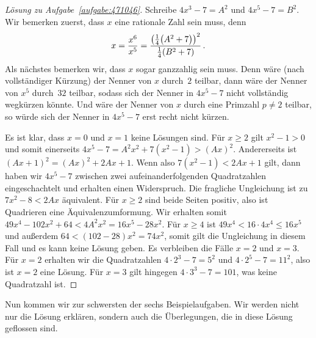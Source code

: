 \begin{proof}[Lösung zu Aufgabe~\ref{aufgabe:471046}]
	Schreibe $4x^3-7=A^2$ und $4x^5-7=B^2$. Wir bemerken zuerst, dass $x$ eine rationale Zahl sein muss, denn
	\begin{equation*}
		x=\frac{x^6}{x^5}=\frac{\parens*{\frac14\parens*{A^2+7}}^2}{\frac14\parens*{B^2+7}}\,.
	\end{equation*}
	Als nächstes bemerken wir, dass $x$ sogar ganzzahlig sein muss. Denn wäre (nach vollständiger Kürzung) der Nenner von $x$ durch~$2$ teilbar, dann wäre der Nenner von $x^5$ durch~$32$ teilbar, sodass sich der Nenner in $4x^5-7$ nicht vollständig wegkürzen könnte. Und wäre der Nenner von $x$ durch eine Primzahl $p\neq 2$ teilbar, so würde sich der Nenner in $4x^5-7$ erst recht nicht kürzen.
	
	Es ist klar, dass $x=0$ und $x=1$ keine Lösungen sind. Für $x\geqslant 2$ gilt $x^2-1>0$ und somit einerseits $4x^5-7=A^2x^2+7(x^2-1)>(Ax)^2$. Andererseits ist $(Ax+1)^2=(Ax)^2+2Ax+1$. Wenn also $7(x^2-1)<2Ax+1$ gilt, dann haben wir $4x^5-7$ zwischen zwei aufeinanderfolgenden Quadratzahlen eingeschachtelt und erhalten einen Widerspruch. Die fragliche Ungleichung ist zu $7x^2-8<2Ax$ äquivalent. Für $x\geqslant 2$ sind beide Seiten positiv, also ist Quadrieren eine Äquivalenzumformung. Wir erhalten somit $49x^4-102x^2+64<4A^2x^2=16x^5-28x^2$. Für $x\geqslant 4$ ist $49x^4<16\cdot 4x^4\leqslant 16x^5$ und außerdem $64<(102-28)x^2=74x^2$, somit gilt die Ungleichung in diesem Fall und es kann keine Lösung geben. Es verbleiben die Fälle $x=2$ und $x=3$. Für $x=2$ erhalten wir die Quadratzahlen $4\cdot 2^3-7=5^2$ und $4\cdot 2^5-7=11^2$, also ist $x=2$ eine Lösung. Für $x=3$ gilt hingegen $4\cdot 3^3-7=101$, was keine Quadratzahl ist.
\end{proof}

Nun kommen wir zur schwersten der sechs Beispielaufgaben. Wir werden nicht nur die Lösung erklären, sondern auch die Überlegungen, die in diese Lösung geflossen sind.

